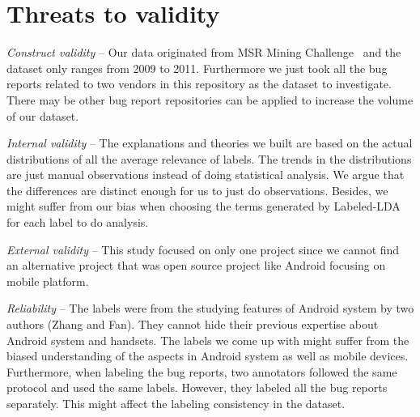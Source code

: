 \documentclass[10pt, conference, compsocconf]{IEEEtran}
\begin{document}

\section{Threats to validity}
\label{sec:threats}

\textit{Construct validity} – Our data originated from MSR Mining
Challenge~\cite{MSRChallenge2012} and the dataset only ranges from
2009 to 2011. Furthermore we just took all the bug reports related to
two vendors in this repository as the dataset to investigate. There
may be other bug report repositories can be applied to increase the
volume of our dataset.

\textit{Internal validity} – The explanations and theories we built
are based on the actual distributions of all the average relevance of
labels. The trends in the distributions are just manual observations
instead of doing statistical analysis. We argue that the differences
are distinct enough for us to just do observations. Besides, we might
suffer from our bias when choosing the terms generated by Labeled-LDA
for each label to do analysis.

\textit{External validity} – This study focused on only one project
since we cannot find an alternative project that was open source
project like Android focusing on mobile platform.

\textit{Reliability} – The labels were from the studying features of
Android system by two authors (Zhang and Fan). They cannot hide their
previous expertise about Android system and handsets. The labels we
come up with might suffer from the biased understanding of the aspects
in Android system as well as mobile devices. Furthermore, when
labeling the bug reports, two annotators followed the same protocol
and used the same labels. However, they labeled all the bug reports
separately. This might affect the labeling consistency in the dataset.
\end{document}
